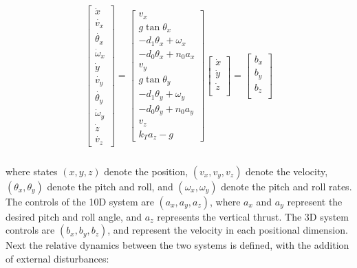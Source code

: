 \begin{equation}
\label{eq:Quad10D_dyn}
\begin{aligned}
\begin{array}{c}
\left[
\begin{array}{c}
\dot{x}\\
\dot{v_x}\\
\dot{\theta_x}\\
\dot\omega_x\\
\dot{y}\\
\dot{v_y}\\
\dot{\theta_y}\\
\dot\omega_y\\
\dot{z}\\
\dot{v_z}
\end{array}
\right]
=
\left[
\begin{array}{c}
v_x\\
g \tan \theta_x\\
-d_1 \theta_x + \omega_x\\
-d_0 \theta_x + n_0 a_x\\
v_y\\
g \tan \theta_y\\
-d_1 \theta_y + \omega_y\\
-d_0 \theta_y + n_0 a_y\\
v_z \\
k_T a_z - g
\end{array}
\right]
\left[
\begin{array}{c}
\dot{x}\\
\dot{y}\\
\dot{z}\\
\end{array}
\right]
=
\left[
\begin{array}{c}
b_x\\
b_y\\
b_z \\
\end{array}
\right]
\end{array}\\
\end{aligned}
\end{equation}

where states $(x, y, z)$ denote the position, $(v_x, v_y, v_z)$ denote the velocity, $(\theta_x, \theta_y)$ denote the pitch and roll, and $(\omega_x, \omega_y)$ denote the pitch and roll rates. The controls of the 10D system are $(a_x, a_y, a_z)$, where $a_x$ and $a_y$ represent the desired pitch and roll angle, and $a_z$ represents the vertical thrust. The 3D system controls are $(b_x, b_y, b_z)$, and represent the velocity in each positional dimension. Next the relative dynamics between the two systems is defined, with the addition of external disturbances:

